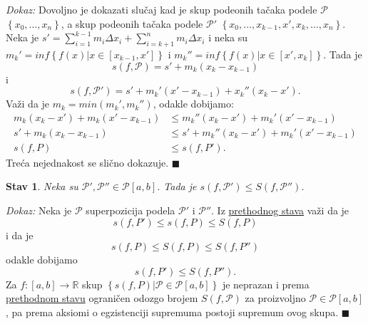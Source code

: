 \documentclass{article}
\newtheorem{stav}{Stav}[section]
\begin{document}
\textit{Dokaz:} Dovoljno je dokazati slučaj kad je skup podeonih tačaka podele $\mathcal{P}$
$\left\{x_0,\dotsc,x_n\right\}$, a skup podeonih tačaka podele $\mathcal{P}'$
$\left\{x_0,\dotsc,x_{k-1},x',x_k,\dotsc,x_n\right\}$. Neka je $\displaystyle s'=\sum_{i=1}^{k-1}m_i\Delta x_i+\sum_{i=k+1}^{n}m_i\Delta x_i$ i neka su
$m_k'=inf\left\{f\left(x\right)\big|x\in\left[x_{k-1},x'\right]\right\}$ i $m_k''=inf\left\{f\left(x\right)\big|x\in\left[x',x_k\right]\right\}$.
Tada je $$s\left(f,\mathcal{P}\right)=s'+m_k\left(x_k-x_{k-1}\right)$$
i
$$s\left(f,\mathcal{P}'\right)=s'+m_k'\left(x'-x_{k-1}\right)+x_k''\left(x_k-x'\right).$$
Važi da je $m_k=min\left(m_k',m_k''\right)$, odakle dobijamo:
\begin{align*}
    m_k\left(x_k-x'\right)+m_k\left(x'-x_{k-1}\right) & \leq m_k''\left(x_k-x'\right)+m_k'\left(x'-x_{k-1}\right)    \\
    s'+m_k\left(x_k-x_{k-1}\right)                    & \leq s'+m_k''\left(x_k-x'\right)+m_k'\left(x'-x_{k-1}\right) \\
    s\left(f,P\right)                                 & \leq s\left(f,P'\right).
\end{align*}
Treća nejednakost se slično dokazuje.
\null\hfill $\blacksquare$\par

\begin{stavbox}
    \label{stav_2.2}
    \begin{stav}
        Neka su $\mathcal{P}',\mathcal{P}''\in\mathcal{P}\left[a,b\right]$. Tada je $s\left(f,\mathcal{P}'\right)\leq S\left(f,\mathcal{P}''\right)$.
    \end{stav}
\end{stavbox}

\textit{Dokaz:} Neka je $\mathcal{P}$ superpozicija podela $\mathcal{P}'$ i $\mathcal{P}''$. Iz
\hyperref[stav_2.1]{prethodnog stava} važi da je
$$s\left(f,P'\right)\leq s\left(f,P\right)\leq S\left(f,P\right)$$
i da je
$$s\left(f,P\right)\leq S\left(f,P\right)\leq S\left(f,P''\right)$$
odakle dobijamo
$$s\left(f,P'\right)\leq S\left(f,P''\right).$$
Za $f: \left[a,b\right]\longrightarrow\mathbb{R}$ skup $\left\{s\left(f,P\right)\big|\mathcal{P}\in\mathcal{P}\left[a,b\right]\right\}$
je neprazan i prema \hyperref[stav_2.2]{prethodnom stavu} ograničen odozgo brojem $S\left(f,\mathcal{P}\right)$ za proizvoljno $\mathcal{P}\in\mathcal{P}\left[a,b\right]$,
pa prema aksiomi o egzistenciji supremuma postoji supremum ovog
skupa.
\null\hfill $\blacksquare$\par
\end{document}
